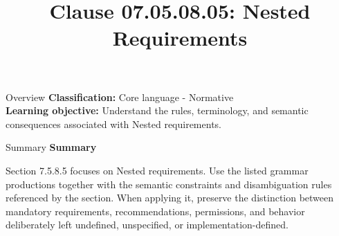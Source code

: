\documentclass[10pt,letterpaper]{article}
\title{Clause 07.05.08.05: Nested Requirements}
\author{}
\date{}
\begin{document}
\maketitle
\begin{CornellOverviewBox}{Overview}
\textbf{Classification:} Core language - Normative\\[2pt]
\textbf{Learning objective:} Understand the rules, terminology, and semantic consequences associated with Nested requirements.
\end{CornellOverviewBox}\begin{CornellSummaryBox}{Summary}
{\sffamily\bfseries\color{Accent} Summary}\par\vspace{3pt}Section 7.5.8.5 focuses on Nested requirements. Use the listed grammar productions together with the semantic constraints and disambiguation rules referenced by the section. When applying it, preserve the distinction between mandatory requirements, recommendations, permissions, and behavior deliberately left undefined, unspecified, or implementation-defined.
\end{CornellSummaryBox}
\end{document}
